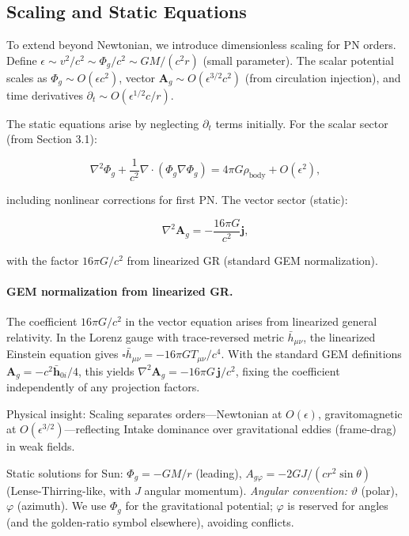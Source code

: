 \subsection{Scaling and Static Equations}

To extend beyond Newtonian, we introduce dimensionless scaling for PN orders. Define $\epsilon \sim v^2 / c^2 \sim \Phi_g / c^2 \sim G M / (c^2 r)$ (small parameter). The scalar potential scales as $\Phi_g \sim O(\epsilon c^2)$, vector $\mathbf{A}_g \sim O(\epsilon^{3/2} c^2)$ (from circulation injection), and time derivatives $\partial_t \sim O(\epsilon^{1/2} c / r)$.

The static equations arise by neglecting $\partial_t$ terms initially. For the scalar sector (from Section 3.1):

\[
\nabla^2 \Phi_g + \frac{1}{c^2} \nabla \cdot (\Phi_g \nabla \Phi_g) = 4\pi G \rho_{\text{body}} + O(\epsilon^2),
\]

including nonlinear corrections for first PN. The vector sector (static):

\[
\nabla^2 \mathbf{A}_g = -\frac{16\pi G}{c^2} \mathbf{j},
\]

with the factor $16\pi G/c^2$ from linearized GR (standard GEM normalization).

\paragraph{GEM normalization from linearized GR.}
The coefficient $16\pi G/c^2$ in the vector equation arises from linearized general relativity.
In the Lorenz gauge with trace-reversed metric $\bar{h}_{\mu\nu}$, the linearized Einstein
equation gives $\square\bar{h}_{\mu\nu} = -16\pi G T_{\mu\nu}/c^4$. With the standard GEM
definitions $\mathbf{A}_g = -c^2\bar{\mathbf{h}}_{0i}/4$, this yields
$\nabla^2\mathbf{A}_g = -16\pi G\,\mathbf{j}/c^2$, fixing the coefficient independently
of any projection factors.

Physical insight: Scaling separates orders—Newtonian at $O(\epsilon)$, gravitomagnetic at $O(\epsilon^{3/2})$—reflecting Intake dominance over gravitational eddies (frame-drag) in weak fields.

Static solutions for Sun: $\Phi_g = -G M / r$ (leading), $A_{g\varphi} = -2 G J / (c r^2 \sin \theta)$ (Lense-Thirring-like, with $J$ angular momentum).
\noindent\emph{Angular convention:} $\vartheta$ (polar), $\varphi$ (azimuth). We use $\Phi_g$ for the gravitational potential; $\varphi$ is reserved for angles (and the golden-ratio symbol elsewhere), avoiding conflicts.

